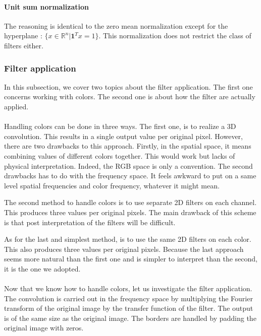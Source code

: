 \documentclass[a4paper]{report}
\begin{document}
			\paragraph{Unit sum normalization}
			The reasoning is identical to the zero mean normalization except for the hyperplane : $\{x \in \mathbb{R}^n | \textbf{1}^{T}x = 1\}$. This normalization does not restrict the class of filters either. 
			
			
			\subsubsection{Filter application}%
			In this subsection, we cover two topics about the filter application. The first one concerns working with colors. The second one is about how the filter are actually applied. 
			\paragraph{}
			Handling colors can be done in three ways. 
			The first one, is to realize a 3D convolution. This results in a single output value per original pixel. However, there are two drawbacks to this approach. Firstly, in the spatial space, it means combining values of different colors together. This would work but lacks of physical interpretation. Indeed, the RGB space is only a convention. The second drawbacks has to do with the frequency space. It feels awkward to put on a same level spatial frequencies and color frequency, whatever it might mean.
			\par
			The second method to handle colors is to use separate 2D filters on each channel. This produces three values per original pixels. The main drawback of this scheme is that post interpretation of the filters will be difficult.
			\par
			As for the last and simplest method, is to use the same 2D filters on each color. This also produces three values per original pixels.
			Because the last approach seems more natural than the first one and is simpler to interpret than the second, it is the one we adopted.
			\paragraph{}
			Now that we know how to handle colors, let us investigate the filter application.
			The convolution is carried out in the frequency space by multiplying the Fourier transform of the original image by the transfer function of the filter. The output is of the same size as the original image. The borders are handled by padding the original image with zeros.
			
\end{document}
